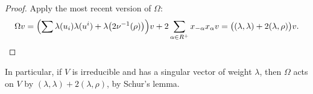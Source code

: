 \begin{proof}
Apply the most recent version of $\Omega$:
\[
  \Omega v = \Bigl(\sum \lambda(u_i)\lambda(u^i) + \lambda\bigl(2\nu^{-1}(\rho)\bigr)\Bigr)v
    + 2\sum_{\alpha \in R^+} x_{-\alpha}x_\alpha v
  = \bigl((\lambda, \lambda) + 2(\lambda, \rho)\bigr)v. \qedhere
\]
\end{proof}

In particular, if $V$ is irreducible and has a singular vector of weight
$\lambda$, then $\Omega$ acts on $V$ by $(\lambda, \lambda) + 2(\lambda, \rho)$,
by Schur's lemma.
